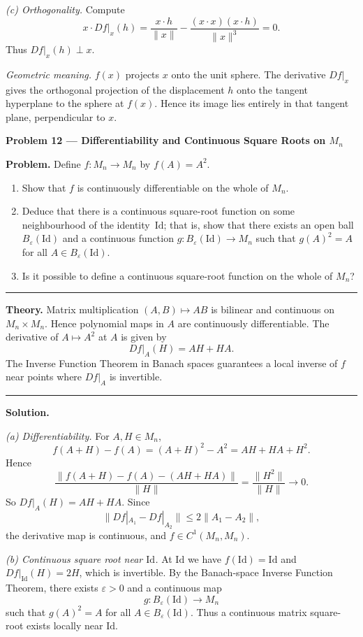 \documentclass[12pt,a4paper]{article}
\theoremstyle{plain}
\theoremstyle{definition}
\theoremstyle{remark}
\theoremstyle{remark}
\newcommand{\probheader}[1]{%
	\par\vspace{8pt}%
	{\Large\bfseries #1\par}%
	\vspace{6pt}%
}
\newcommand{\sep}{\vspace{6pt}\hrule\vspace{8pt}}
\begin{document}
	\medskip
	
	\textit{(c) Orthogonality.}
	Compute
	\[
	x\!\cdot\!Df|_x(h)
	=\frac{x\!\cdot\!h}{\|x\|}
	-\frac{(x\!\cdot\!x)(x\!\cdot\!h)}{\|x\|^3}
	=0.
	\]
	Thus $Df|_x(h)\perp x$.
	
	\textit{Geometric meaning.}
	$f(x)$ projects $x$ onto the unit sphere.
	The derivative $Df|_x$ gives the orthogonal projection of the displacement $h$
	onto the tangent hyperplane to the sphere at $f(x)$.
	Hence its image lies entirely in that tangent plane, perpendicular to $x$.
	
	\probheader{Problem 12 — Differentiability and Continuous Square Roots on $M_n$}
	
	\textbf{Problem.}
	Define $f:M_n\to M_n$ by $f(A)=A^2$.
	\begin{enumerate}[label=(\alph*), leftmargin=1.2cm]
		\item Show that $f$ is continuously differentiable on the whole of $M_n$.
		\item Deduce that there is a continuous square-root function on some neighbourhood of the identity~$\mathrm{Id}$; 
		that is, show that there exists an open ball $B_\varepsilon(\mathrm{Id})$ and a continuous function 
		$g:B_\varepsilon(\mathrm{Id})\to M_n$ such that $g(A)^2=A$ for all $A\in B_\varepsilon(\mathrm{Id})$.
		\item Is it possible to define a continuous square-root function on the whole of $M_n$?
	\end{enumerate}
	
	\sep
	
	\textbf{Theory.}
	Matrix multiplication $(A,B)\mapsto AB$ is bilinear and continuous on $M_n\times M_n$.
	Hence polynomial maps in $A$ are continuously differentiable.
	The derivative of $A\mapsto A^2$ at $A$ is given by
	\[
	Df|_A(H)=AH+HA.
	\]
	The Inverse Function Theorem in Banach spaces guarantees a local inverse of $f$ near points where $Df|_A$ is invertible.
	
	\sep
	
	\textbf{Solution.}
	
	\textit{(a) Differentiability.}
	For $A,H\in M_n$,
	\[
	f(A+H)-f(A)=(A+H)^2-A^2=AH+HA+H^2.
	\]
	Hence
	\[
	\frac{\|f(A+H)-f(A)-(AH+HA)\|}{\|H\|}=\frac{\|H^2\|}{\|H\|}\to0.
	\]
	So $Df|_A(H)=AH+HA$.
	Since
	\[
	\|Df|_{A_1}-Df|_{A_2}\|
	\le 2\|A_1-A_2\|,
	\]
	the derivative map is continuous, and $f\in C^1(M_n,M_n)$.
	
	\medskip
	
	\textit{(b) Continuous square root near $\mathrm{Id}$.}
	At $\mathrm{Id}$ we have $f(\mathrm{Id})=\mathrm{Id}$ and
	$Df|_{\mathrm{Id}}(H)=2H$, which is invertible.
	By the Banach-space Inverse Function Theorem,
	there exists $\varepsilon>0$ and a continuous map
	\[
	g:B_\varepsilon(\mathrm{Id})\to M_n
	\]
	such that $g(A)^2=A$ for all $A\in B_\varepsilon(\mathrm{Id})$.
	Thus a continuous matrix square-root exists locally near $\mathrm{Id}$.
	
\end{document}

